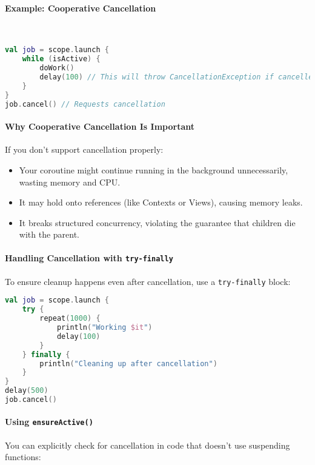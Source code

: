 \documentclass[a4paper,12pt]{article}
\begin{document}
\paragraph{Example: Cooperative Cancellation}\mbox{}\\

\begin{lstlisting}[language=Kotlin]
val job = scope.launch {
    while (isActive) {
        doWork()
        delay(100) // This will throw CancellationException if cancelled
    }
}
job.cancel() // Requests cancellation
\end{lstlisting}

\paragraph{Why Cooperative Cancellation Is Important}

If you don't support cancellation properly:
\begin{itemize}
  \item Your coroutine might continue running in the background unnecessarily, wasting memory and CPU.
  \item It may hold onto references (like Contexts or Views), causing memory leaks.
  \item It breaks structured concurrency, violating the guarantee that children die with the parent.
\end{itemize}

\paragraph{Handling Cancellation with \texttt{try-finally}}

To ensure cleanup happens even after cancellation, use a \texttt{try-finally} block:

\begin{lstlisting}[language=Kotlin]
val job = scope.launch {
    try {
        repeat(1000) {
            println("Working $it")
            delay(100)
        }
    } finally {
        println("Cleaning up after cancellation")
    }
}
delay(500)
job.cancel()
\end{lstlisting}

\paragraph{Using \texttt{ensureActive()}}

You can explicitly check for cancellation in code that doesn’t use suspending functions:
\end{document}
